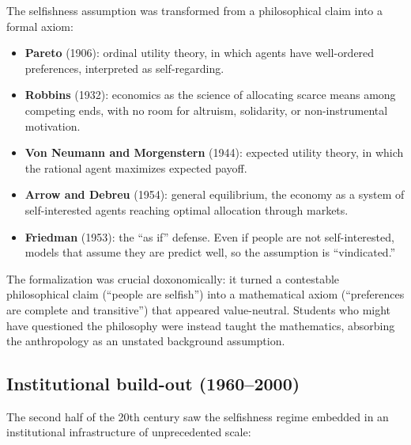 The selfishness assumption was transformed from a philosophical claim into a formal axiom:
\begin{itemize}[nosep]
  \item \textbf{Pareto} (1906): ordinal utility theory, in which agents have well-ordered preferences, interpreted as self-regarding.
  \item \textbf{Robbins} (1932): economics as the science of allocating scarce means among competing ends, with no room for altruism, solidarity, or non-instrumental motivation.
  \item \textbf{Von Neumann and Morgenstern} (1944): expected utility theory, in which the rational agent maximizes expected payoff.
  \item \textbf{Arrow and Debreu} (1954): general equilibrium, the economy as a system of self-interested agents reaching optimal allocation through markets.
  \item \textbf{Friedman} (1953): the ``as if'' defense. Even if people are not self-interested, models that assume they are predict well, so the assumption is ``vindicated.''
\end{itemize}

The formalization was crucial doxonomically: it turned a contestable philosophical claim (``people are selfish'') into a mathematical axiom (``preferences are complete and transitive'') that appeared value-neutral.
Students who might have questioned the philosophy were instead taught the mathematics, absorbing the anthropology as an unstated background assumption.

\subsection{Institutional build-out (1960--2000)}

The second half of the 20th century saw the selfishness regime embedded in an institutional infrastructure of unprecedented scale:

